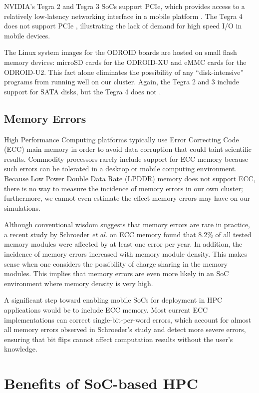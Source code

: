 \documentclass[11pt]{book}
\begin{document}
NVIDIA's Tegra 2 and Tegra 3 SoCs support PCIe, which provides access to a relatively
low-latency networking interface in a mobile platform \cite{rajovic-13}.  The Tegra 4 does
not support PCIe \cite{arstch-tegra}, illustrating the lack of demand for high speed I/O
in mobile devices.

The Linux system images for the ODROID boards are hosted on small flash memory devices:
microSD cards for the ODROID-XU and eMMC cards for the ODROID-U2.  This fact alone
eliminates the possibility of any ``disk-intensive'' programs from running well on our
cluster. Again, the Tegra 2 and 3 include support for SATA disks, but the Tegra 4 does not
\cite{arstch-tegra}.

\subsection{Memory Errors}

High Performance Computing platforms typically use Error Correcting Code (ECC) main memory
in order to avoid data corruption that could taint scientific results.  Commodity
processors rarely include support for ECC memory because such errors can be tolerated in a
desktop or mobile computing environment.  Because Low Power Double Data Rate (LPDDR)
memory does not support ECC, there is no way to measure the incidence of memory errors in
our own cluster; furthermore, we cannot even estimate the effect memory errors may have on
our simulations.

Although conventional wisdom suggests that memory errors are rare in practice, a recent
study by Schroeder \emph{et al.} \cite{schroeder-09} on ECC memory found that 8.2\% of all
tested memory modules were affected by at least one error per year.  In addition, the
incidence of memory errors increased with memory module density.  This makes sense when
one considers the possibility of charge sharing in the memory modules.  This implies that
memory errors are even more likely in an SoC environment where memory density is very
high.

A significant step toward enabling mobile SoCs for deployment in HPC applications would be
to include ECC memory.  Most current ECC implementations can correct single-bit-per-word
errors, which account for almost all memory errors observed in Schroeder's study
\cite{schroeder-09} and detect more severe errors, ensuring that bit flips cannot affect
computation results without the user's knowledge.

\section{Benefits of SoC-based HPC}
\end{document}
